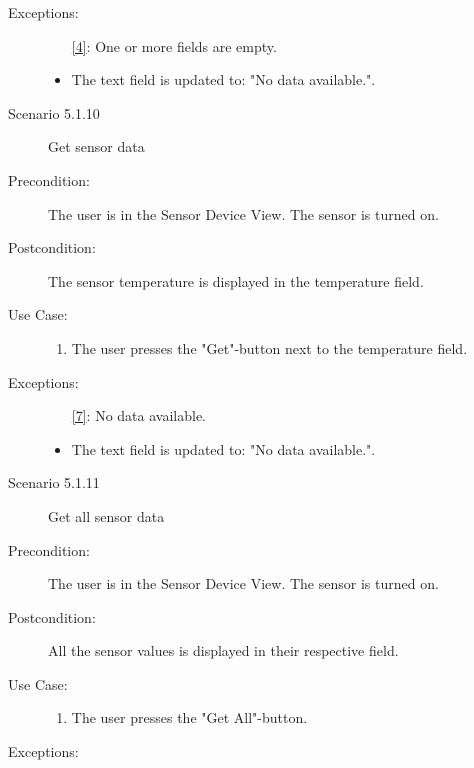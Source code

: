 \documentclass[a4paper]{article}
\begin{document}
\begin{description}
\item[Exceptions:]
\item[]

\begin{itemize}
\item [\ref{4}:] One or more fields are empty.
\item The text field is updated to: "No data available.".
\end{itemize}

\item[]

\item[Scenario 5.1.10] Get sensor data
\item[Precondition:] The user is in the Sensor Device View. The sensor is turned on.
\item[Postcondition:] The sensor temperature is displayed in the temperature field.
\item[Use Case:]\mbox{}
\begin{enumerate}
\item \label{7} The user presses the "Get"-button next to the temperature field.

\end{enumerate}

\item[Exceptions:]
\item[]

\begin{itemize}
\item [\ref{7}:] No data available.
\item The text field is updated to: "No data available.".
\end{itemize}

\item[]

\item[Scenario 5.1.11] Get all sensor data
\item[Precondition:] The user is in the Sensor Device View. The sensor is turned on.
\item[Postcondition:] All the sensor values is displayed in their respective field.
\item[Use Case:]\mbox{}
\begin{enumerate}
\item \label{7} The user presses the "Get All"-button.

\end{enumerate}

\item[Exceptions:]
\item[]


\end{description}
\end{document}
